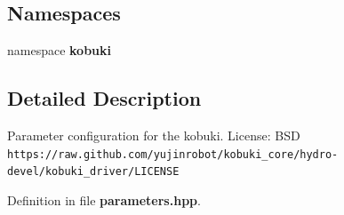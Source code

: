 \subsection*{\-Namespaces}
\begin{DoxyCompactItemize}
\item 
namespace {\bf kobuki}
\end{DoxyCompactItemize}


\subsection{\-Detailed \-Description}
\-Parameter configuration for the kobuki. \-License\-: \-B\-S\-D {\tt https\-://raw.\-github.\-com/yujinrobot/kobuki\-\_\-core/hydro-\/devel/kobuki\-\_\-driver/\-L\-I\-C\-E\-N\-S\-E} 

\-Definition in file {\bf parameters.\-hpp}.

